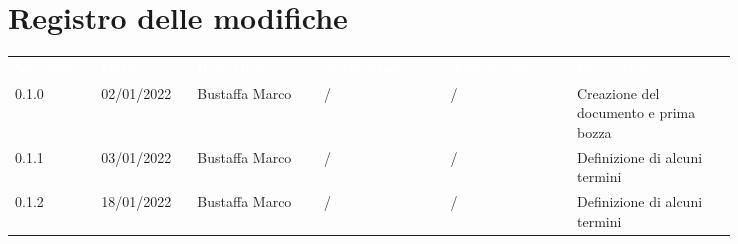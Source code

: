 \section*{Registro delle modifiche}

{\renewcommand{\arraystretch}{1.5}
\scriptsize
\begin{tabular}{p{0.10\linewidth}p{0.10\linewidth}p{0.15\linewidth}p{0.15\linewidth}p{0.15\linewidth}p{0.19\linewidth}}
	\rowcolor[RGB]{33, 73, 50}
	\textcolor{white}{\textbf{Versione}} & \textcolor{white}{\textbf{Data}} &
	\textcolor{white}{\textbf{Redattore}} & \textcolor{white}{\textbf{Verificatore}} &
	\textcolor{white}{\textbf{Approvatore}} & \textcolor{white}{\textbf{Descrizione}}\\
	\rowcolor[RGB]{216, 235, 171}
	0.1.0 & 02/01/2022 & Bustaffa Marco & / &/& Creazione del documento e prima bozza\\
	\rowcolor[RGB]{233, 245, 206}
	0.1.1 & 03/01/2022 & Bustaffa Marco & / &/& Definizione di alcuni termini\\
	\rowcolor[RGB]{216, 235, 171}
	0.1.2 & 18/01/2022 & Bustaffa Marco & / &/& Definizione di alcuni termini\\
\end{tabular}
}
